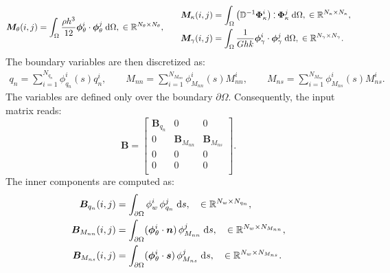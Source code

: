 \documentclass[preprint,12pt]{elsarticle}
\def\onedot{$\mathsurround0pt\ldotp$}
\def\cddot{%
	\mathbin{\vcenter{\baselineskip.67ex
			\hbox{\onedot}\hbox{\onedot}}%
}}
\begin{document}
{\begin{equation}
\begin{gathered}
\begin{aligned}
	&\bm{M}_\theta(i,j) = \int_{\Omega} \frac{\rho h^3}{12} \bm{\phi}_\theta^i \cdot \bm{\phi}_\theta^j \d\Omega, \; \in \mathbb{R}^{N_\theta \times N_\theta},\\
	\end{aligned} \qquad
	\begin{aligned}
	&\bm{M}_\kappa(i,j) = \int_{\Omega}  \left( \mathbb{D}^{-1} \bm{\Phi}_\kappa^i \right) \cddot \bm{\Phi}_\kappa^j \d\Omega, \; \in \mathbb{R}^{N_\kappa \times N_\kappa},\\
	&\bm{M}_{\gamma}(i,j) = \int_{\Omega} \frac{1}{G h k} \bm{\phi}_{\gamma}^i \cdot \bm{\phi}_{\gamma}^j \d\Omega, \; \in \mathbb{R}^{N_{\gamma} \times N_{\gamma}}. \\
	\end{aligned}
	\end{gathered}
\end{equation}
The boundary variables are then discretized as:
\begin{equation}
	\begin{aligned}
	q_n = \sum_{i = 1}^{N_{q_n}} \phi_{q_n}^i(s) q_n^i, \qquad
	M_{nn} = \sum_{i = 1}^{N_{M_{nn}}} \phi_{M_{nn}}^i(s) M_{nn}^i, \qquad
	M_{ns} = \sum_{i = 1}^{N_{M_{ns}}} \phi_{M_{ns}}^i(s) M_{ns}^i.
	\end{aligned}
\end{equation}
The variables are defined only over the boundary $\partial\Omega$. Consequently, the input matrix reads:
\begin{equation}
\bm{B} = \begin{bmatrix}
\bm{B}_{q_n} & 0 & 0 \\
0 & \bm{B}_{M_{nn}} & \bm{B}_{M_{ns}} \\
0 & 0 & 0 \\
0 & 0 & 0 \\
\end{bmatrix}.
\end{equation}
The inner components are computed as:
\begin{equation}
\begin{aligned}
\bm{B}_{q_n}(i,j) &= \int_{\partial\Omega} {\phi}_{w}^i \, {\phi}_{q_n}^j \d{s}, \quad \in \mathbb{R}^{N_w \times N_{q_n}} , \\
\bm{B}_{M_{nn}}(i,j) &= \int_{\partial\Omega} (\bm{\phi}_{\theta}^i \cdot \bm{n})\, \phi_{M_{nn}}^j \d{s}, \quad \in \mathbb{R}^{N_w \times N_{M_{nn}}} , \\
\bm{B}_{M_{ns}}(i,j) &= \int_{\partial\Omega} (\bm{\phi}_{\theta}^i \cdot \bm{s})\, \phi_{M_{ns}}^j \d{s}, \quad \in \mathbb{R}^{N_w \times N_{M_{ns}}}. \\

\end{aligned}
\end{equation}}
\end{document}
